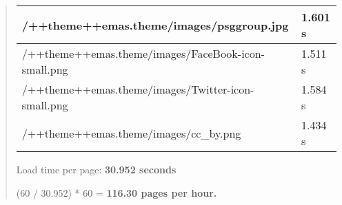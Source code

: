 \documentclass[letterpaper,10pt,english]{sphinxmanual}
\begin{document}
\begin{quote}
\begin{tabulary}{\linewidth}{|L|L|}
/++theme++emas.theme/images/psggroup.jpg
 & 
1.601 s
\\\hline

/++theme++emas.theme/images/FaceBook-icon-small.png
 & 
1.511 s
\\\hline

/++theme++emas.theme/images/Twitter-icon-small.png
 & 
1.584 s
\\\hline

/++theme++emas.theme/images/cc\_by.png
 & 
1.434 s
\\\hline
\end{tabulary}


Load time per page: \textbf{30.952 seconds}

(60 / 30.952) * 60 = \textbf{116.30 pages per hour.}
\end{quote}
\end{document}
